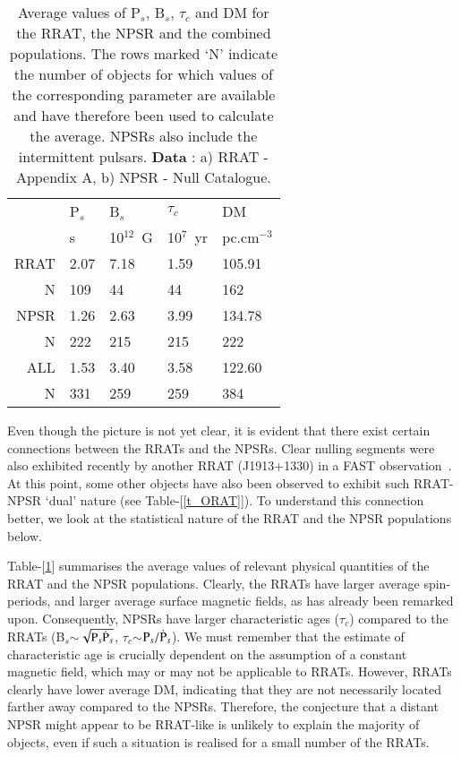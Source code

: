\documentclass{jaa}
\newcommand{\psdot}{\mbox{$\dot{\rm P}_s$}}
\begin{document}
%
\begin{table}[h]
%
\centering
\begin{tabular}{rllll} \toprule
     & P$_s$ & B$_s$       & $\tau_c$    & DM         \\ 
     & s     & 10$^{12}$~G & 10$^7$~yr & pc.cm$^{-3}$ \\ \midrule
RRAT & 2.07  & 7.18       & 1.59      & 105.91      \\ 
N    & 109   & 44         & 44        & 162         \\ \midrule
NPSR & 1.26  & 2.63       & 3.99      & 134.78      \\
N    & 222   & 215        & 215       & 222         \\ \midrule
ALL  & 1.53  & 3.40       & 3.58      & 122.60      \\
N    & 331   & 259        & 259       & 384         \\  \bottomrule
\end{tabular}
%
\caption{Average values of P$_s$, B$_s$, $\tau_c$ and DM for the RRAT,
  the NPSR and the combined populations. The rows  marked `N' indicate
  the  number  of  objects  for  which  values  of  the  corresponding
  parameter are  available and have  therefore been used  to calculate
  the average. NPSRs also include the intermittent pulsars. {\bf Data}
  : a) RRAT - Appendix A, b) NPSR - Null Catalogue.}
%
\label{t_stat-I}
%  
\end{table}
%

Even though  the picture is not   yet clear, it is  evident that there
exist  certain connections  between the  RRATs and  the NPSRs.  Clear
nulling  segments  were  also   exhibited  recently  by  another  RRAT
(J1913+1330) in  a FAST  observation~\cite{lu19}. At this  point, some
other objects have also been observed to exhibit such RRAT-NPSR `dual'
nature  (see  Table-[\ref{t_ORAT}]).   To  understand  this  connection
better, we  look at the  statistical nature of  the RRAT and  the NPSR
populations below.

Table-[\ref{t_stat-I}]  summarises  the   average  values  of  relevant
physical quantities of the RRAT and the NPSR populations. Clearly, the
RRATs  have larger  average spin-periods,  and larger  average surface
magnetic  fields, as  has already  been remarked  upon.  Consequently,
NPSRs have larger characteristic ages ($\tau_c$) compared to the RRATs
(B$_s$$\sim$$\sqrt{{\rm        P}_s\psdot}$,       $\tau_c$$\sim$${\rm
  P}_s/\psdot$).  We must remember that the estimate of characteristic
age is  crucially dependent on  the assumption of a  constant magnetic
field, which  may or may not  be applicable to RRATs.   However, RRATs
clearly  have  lower   average  DM,  indicating  that   they  are  not
necessarily located farther away compared to the NPSRs. Therefore, the
conjecture  that  a distant  NPSR  might  appear  to be  RRAT-like  is
unlikely to explain the majority of  objects, even if such a situation
is realised for a small number of the RRATs.
 
\end{document}
